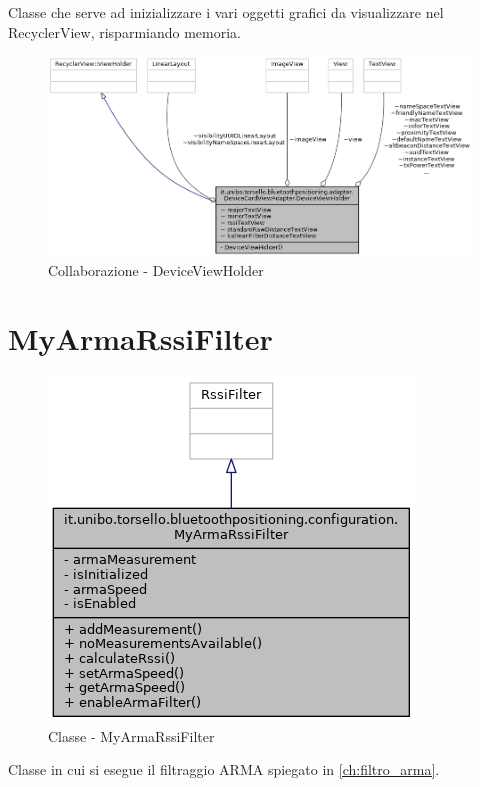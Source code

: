 Classe che serve ad inizializzare i vari oggetti grafici da visualizzare nel RecyclerView, risparmiando memoria.

\begin{figure}[ph]
	\centering
	\includegraphics[width=1.5\linewidth,angle=90]{img/uml/class/classit_1_1unibo_1_1torsello_1_1bluetoothpositioning_1_1adapter_1_1DeviceCardViewAdapter_1_1DeviceViewHolder__coll__graph.png}
	\caption{Collaborazione - DeviceViewHolder}
\end{figure}

\newpage
\section{MyArmaRssiFilter}
\begin{figure}[ph]
	\centering
	\includegraphics[width=0.6\linewidth]{img/uml/class/classit_1_1unibo_1_1torsello_1_1bluetoothpositioning_1_1configuration_1_1MyArmaRssiFilter__inherit__graph.png}
	\caption{Classe - MyArmaRssiFilter}
\end{figure}

Classe in cui si esegue il filtraggio ARMA spiegato in \ref{ch:filtro_arma}.


